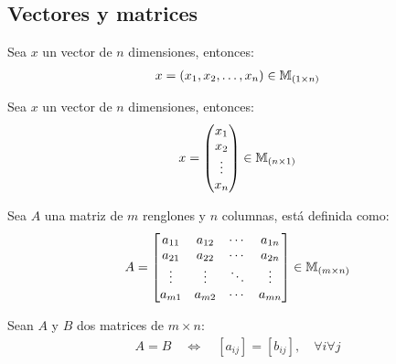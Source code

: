 \subsection{Vectores y matrices}
\label{sec:vectores_y_matrices}

\begin{definition}
{
    \label{def:1.1.1}
    Sea $x$ un vector de $n$ dimensiones, entonces:
    \begin{align*}
        x = (x_1, x_2, \dots, x_n) \in \mathbb{M}_{(1 \times n)}
    \end{align*}
}
\end{definition}

\begin{definition}
{
    \label{def:1.1.2}
    Sea $x$ un vector de $n$ dimensiones, entonces:
    \begin{align*}
        x = \begin{pmatrix}
            x_1 \\
            x_2 \\
            \vdots \\
            x_n
        \end{pmatrix} \in \mathbb{M}_{(n \times 1)}
    \end{align*}
}
\end{definition}

\begin{definition}[Matriz]
{
    \label{def:1.1.3}
    Sea $A$ una matriz de $m$ renglones y $n$ columnas, está definida como:
    \begin{align*}
        A = \begin{bmatrix}
            a_{11} & a_{12} & \cdots & a_{1n} \\
            a_{21} & a_{22} & \cdots & a_{2n} \\
            \vdots & \vdots & \ddots  & \vdots \\
            a_{m1} & a_{m2} & \cdots & a_{mn}
        \end{bmatrix} \in \mathbb{M}_{(m \times n)}
    \end{align*}
}
\end{definition}

\begin{definition}[Igualdad]
{
    \label{def:1.1.4}
    Sean $A$ y $B$ dos matrices de $m \times n$:
    \begin{align*}
        A = B \quad \Longleftrightarrow \quad \left[a_{ij}\right] = \left[b_{ij}\right], \quad \forall i \forall j
    \end{align*}
}
\end{definition}

